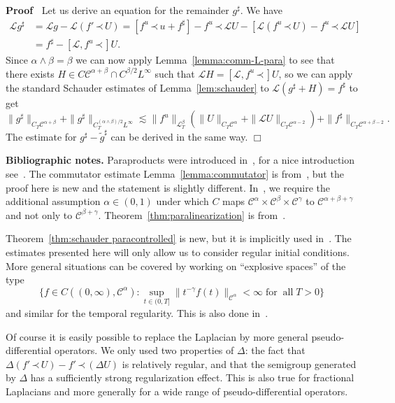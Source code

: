 \documentclass[a4paper,11pt]{article}
\newcommand{\tmop}[1]{\ensuremath{\operatorname{#1}}}
\newcommand{\tmtextbf}[1]{{\bfseries{#1}}}
\newenvironment{proof}{\noindent\textbf{Proof\ }}{\hspace*{\fill}$\Box$\medskip}
\newcommand{\LL}{\mathscr{L}}
\newcommand{\CC}{\mathscr{C}}
\newcommand{\lpara}{\,\mathord{\prec}\,}
\begin{document}
\begin{proof}
  Let us derive an equation for the remainder $g^{\sharp}$. We have
  \begin{align*}
    \LL g^{\sharp} & = \LL g - \LL (f' \lpara U) =  [f^u \lpara u + f^{\sharp}] - f^u \lpara \LL U - [ \LL (f^u \lpara U) - f^u \lpara \LL U ] \\
    & = f^{\sharp} -  [ \LL, f^u \lpara ] U .
  \end{align*}
  Since $\alpha \wedge \beta = \beta$ we can now apply Lemma~\ref{lemma:comm-L-para} to see that there exists $H \in C
  \CC^{\alpha + \beta} \cap C^{\beta / 2} L^{\infty}$ such that $\LL H =
  \left[ \LL, f^u \lpara \right] U$, so we can apply the standard Schauder
  estimates of Lemma~\ref{lem:schauder} to $\LL (g^{\sharp} + H) = 
  f^{\sharp}$ to get
  \[ \| g^{\sharp} \|_{C_T \CC^{\alpha + \beta}} + \| g^{\sharp}
     \|_{C_T^{(\alpha \wedge \beta) / 2} L^{\infty}} \lesssim \| f^u
     \|_{\LL^{\beta}_T} ( \| U \|_{C_T \CC^{\alpha}} + \| \LL U
     \|_{C_T \CC^{\alpha - 2}} ) + \| f^{\sharp} \|_{C_T
     \CC^{\alpha + \beta - 2}} . \]
  The estimate for $g^{\sharp} - \tilde{g}^{\sharp}$ can be derived in the same way.
\end{proof}

\tmtextbf{Bibliographic notes.} Paraproducts were introduced
in~{\cite{Bony1981}}, for a nice introduction see~{\cite{Bahouri2011}}. The
commutator estimate Lemma~\ref{lemma:commutator} is
from~{\cite{Gubinelli2012}}, but the proof here is new and the statement is
slightly different. In~{\cite{Gubinelli2012}}, we require the additional
assumption $\alpha \in (0, 1)$ under which $C$ maps $\CC^{\alpha} \times
\CC^{\beta} \times \CC^{\gamma}$ to $\CC^{\alpha + \beta + \gamma}$ and not
only to $\CC^{\beta + \gamma}$. Theorem~\ref{thm:paralinearization} is
from~{\cite{Gubinelli2012}}.

Theorem~\ref{thm:schauder paracontrolled} is new, but it is implicitly used
in~{\cite{Gubinelli2012}}. The estimates presented here will only allow us to
consider regular initial conditions. More general situations can be covered by
working on ``explosive spaces'' of the type
\[ \Big\{f \in C \left( (0, \infty), \CC^{\alpha} \right) : \sup_{t \in (0, T]} \|
   t^{- \gamma} f (t) \|_{\CC^{\alpha}} < \infty \tmop{for} \tmop{all} T > 0 \Big\}
\]
and similar for the temporal regularity. This is also done
in~{\cite{Gubinelli2012}}.

Of course it is easily possible to replace the Laplacian by more general
pseudo-differential operators. We only used two properties of $\Delta$: the
fact that $\Delta (f' \lpara U) - f' \lpara (\Delta U)$ is relatively regular, and that the
semigroup generated by $\Delta$ has a sufficiently strong regularization
effect. This is also true for fractional Laplacians and more generally for a
wide range of pseudo-differential operators.
\end{document}
